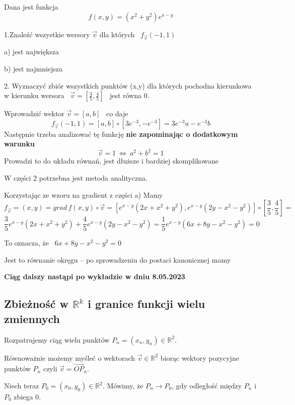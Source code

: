 \begin{przyklad}
    Dana jest funkcja \ \[ f(x,y) = (x^2 + y^2)e^{x-y} \]

    1.Znaleźć wszystkie wersory $\vec{v}$ dla których \ $ f_{\vec{v}} (-1, 1) $
    
    a) jest największa

    b) jest najmniejsza \medskip

    2. Wyznaczyć zbiór wszystkich punktów (x,y) dla których pochodna kierunkowa w kierunku wersora \ $ \vec{v} = \left[ \frac{3}{5}, \frac{4}{5} \right] $ \ jest równa 0.
    \bigskip

    Wprowadzić wektor $ \vec{v} = [a,b] $ \ co daje
    \[ f_{\vec{v}} (-1, 1) = [a,b] \circ [3e^{-3}, -e^{-3}] = 3e^{-3} a - e^{-3}b \]
    Następnie trzeba analizować tę funkcję \textbf{nie zapominając o dodatkowym warunku}
    \[ \vec{v} = 1 \ \Leftrightarrow \ a^2 + b^2 = 1 \]
    Prowadzi to do układu równań, jest dłuższe i bardziej skomplikowane

    W części 2 potrzebna jest metoda analityczna.
    
    Korzystając ze wzoru na gradient z części a) Mamy
    \[ f_{\vec{v}} = (x,y) = grad\, f(x,y) \circ \vec{v} = [e^{x-y} (2x + x^2 + y^2), e^{x-y}(2y - x^2 - y^2)] \circ \left[ \frac{3}{5}, \frac{4}{5} \right] = \]
    \[ \frac{3}{5} e^{x-y} (2x + x^2 + y^2) + \frac{4}{5} e^{x-y} (2y - x^2 - y^2) = \frac{1}{5} e^{x-y} (6x + 8y - x^2 - y^2) = 0 \]

    To oznacza, że \ $ 6x + 8y - x^2 - y^2 = 0 $

    Jest to równanie okręgu -- po sprowadzeniu do postaci kanonicznej mamy \bigskip

    \textbf{Ciąg dalszy nastąpi po wykładzie w dniu 8.05.2023}
\end{przyklad}

\subsection{Zbieżność w $\mathbb{R}^k$ i granice funkcji wielu zmiennych}

Rozpatrujemy ciąg wielu punktów $ P_n = (x_n, y_n) \in \mathbb{R}^2 $.

Równoważnie możemy myśleć o wektorach $ \vec{v} \in \mathbb{R}^2 $ biorąc wektory pozycyjne punktów $P_n$ czyli $\vec{v} = \vec{OP}_n$.

Niech teraz $ P_0 = (x_0, y_0) \in \mathbb{R}^2 $. Mówimy, że $ P_n \to P_0 $, gdy odległość między $P_n$ i $P_0$ zbiega $0$.

